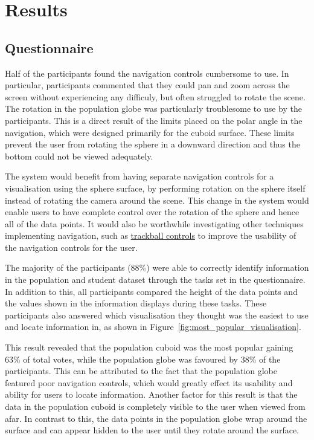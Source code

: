 \section{Results} {
\label{sec:results}

	\subsection{Questionnaire} {
	\label{sec:questionnaire}

		Half of the participants found the navigation controls cumbersome to use. In particular, participants commented that they could pan and zoom across the screen without experiencing any difficuly, but often struggled to rotate the scene. The rotation in the population globe was particularly troublesome to use by the participants. This is a direct result of the limits placed on the polar angle in the navigation, which were designed primarily for the cuboid surface. These limits prevent the user from rotating the sphere in a downward direction and thus the bottom could not be viewed adequately. 

		The system would benefit from having separate navigation controls for a visualisation using the sphere surface, by performing rotation on the sphere itself instead of rotating the camera around the scene. This change in the system would enable users to have complete control over the rotation of the sphere and hence all of the data points. It would also be worthwhile investigating other techniques implementing navigation, such as \href{http://threejs.org/examples/misc_controls_trackball.html}{trackball controls} to improve the usability of the navigation controls for the user.

		The majority of the participants (88\%) were able to correctly identify information in the population and student dataset through the tasks set in the questionnaire. In addition to this, all participants compared the height of the data points and the values shown in the information displays during these tasks. These participants also answered which visualisation they thought was the easiest to use and locate information in, as shown in Figure~\ref{fig:most_popular_visualisation}. 

		

		This result revealed that the population cuboid was the most popular gaining 63\% of total votes, while the population globe was favoured by 38\% of the participants. This can be attributed to the fact that the population globe featured poor navigation controls, which would greatly effect its usability and ability for users to locate information. Another factor for this result is that the data in the population cuboid is completely visible to the user when viewed from afar. In contrast to this, the data points in the population globe wrap around the surface and can appear hidden to the user until they rotate around the surface. 

}}
